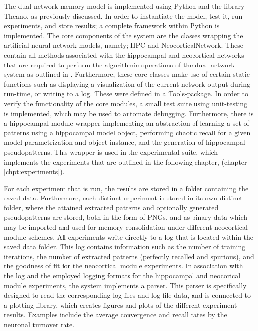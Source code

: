 The dual-network memory model is implemented using Python and the library Theano, as previously discussed. In order to instantiate the model, test it, run experiments, and store results; a complete framework within Python is implemented. The core components of the system are the classes wrapping the artificial neural network models, namely; HPC and NeocorticalNetwork. These contain all methods associated with the hippocampal and neocortical networks that are required to perform the algorithmic operations of the dual-network system as outlined in \citep{Hattori2014}. Furthermore, these core classes make use of certain static functions such as displaying a visualization of the current network output during run-time, or writing to a log. These were defined in a Tools-package. In order to verify the functionality of the core modules, a small test suite using unit-testing is implemented, which may be used to automate debugging.
Furthermore, there is a hippocampal module wrapper implementing an abstraction of learning a set of patterns using a hippocampal model object, performing chaotic recall for a given model parametrization and object instance, and the generation of hippocampal pseudopatterns. This wrapper is used in the experimental suite, which implements the experiments that are outlined in the following chapter, (chapter \ref{chpt:experiments}). 

For each experiment that is run, the results are stored in a folder containing the saved data. Furthermore, each distinct experiment is stored in its own distinct folder, where the attained extracted patterns and optionally generated pseudopatterns are stored, both in the form of PNGs, and as binary data which may be imported and used for memory consolidation under different neocortical module schemes. 
All experiments write directly to a log that is located within the saved data folder. This log contains information such as the number of training iterations, the number of extracted patterns (perfectly recalled and spurious), and the goodness of fit for the neocortical module experiments. 
In association with the log and the employed logging formats for the hippocampal and neocorical module experiments, the system implements a parser. This parser is specifically designed to read the corresponding log-files and log-file data, and is connected to a plotting library, which creates figures and plots of the different experiment results. Examples include the average convergence and recall rates by the neuronal turnover rate.


